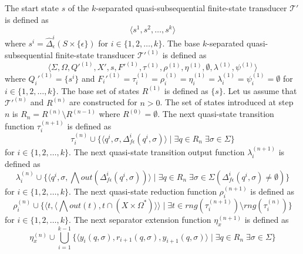 The start state $s$ of the $k$-separated quasi-subsequential finite-state transducer
$\mathcal{T}'$ is defined as
\begin{equation*}
  \langle s^1, s^2, \ldots, s^k \rangle
\end{equation*}
where $s^i = \hat{\Delta}_\epsilon^i(S \times \{ \epsilon \})$ for $i \in \{ 1, 2,
\ldots, k \}$. The base $k$-separated quasi-subsequential finite-state transducer
$\mathcal{T}'^{(1)}$ is defined as
\begin{equation*}
  \langle \Sigma, \Omega, Q'^{(1)}, X', s, F'^{(1)}, \tau^{(1)}, \rho^{(1)},
  \eta^{(1)}, \emptyset, \lambda^{(1)}, \psi^{(1)} \rangle
\end{equation*}
where $Q_i'^{(1)} = \{ s^i \}$ and $F_i'^{(1)} = \tau_i^{(1)} = \rho_i^{(1)} =
\eta_i^{(1)} = \lambda_i^{(1)} = \psi_i^{(1)} = \emptyset$ for $i \in \{ 1, 2,
\ldots, k \}$.
The base set of states $R^{(1)}$ is defined as $\{ s \}$.
Let us assume that $\mathcal{T}'^{(n)}$ and $R^{(n)}$ are constructed for $n > 0$.
The set of states introduced at step $n$ is $R_n = R^{(n)} \setminus R^{(n-1)}$ where
$R^{(0)} = \emptyset$.
The next quasi-state transition function $\tau_i^{(n+1)}$ is defined as
\begin{equation*}
  \tau_i^{(n)} \cup \{ \langle q^i, \sigma, \Delta_{f\epsilon}^i(q^i, \sigma) \rangle
  \mid \exists q \in R_n \; \exists \sigma \in \Sigma \}
\end{equation*}
for $i \in \{ 1, 2, \ldots, k \}$.
The next quasi-state transition output function $\lambda_i^{(n+1)}$ is defined as
\begin{equation*}
  \lambda_i^{(n)} \cup \{ \langle q^i, \sigma, \bigwedge
  out(\Delta_{f\epsilon}^i(q^i, \sigma)) \rangle \mid \exists q \in R_n \; \exists
  \sigma \in \Sigma (\Delta_{f\epsilon}^i(q^i, \sigma) \neq \emptyset) \}
\end{equation*}
for $i \in \{ 1, 2, \ldots, k \}$.
The next quasi-state reduction function $\rho_i^{(n+1)}$ is defined as
\begin{equation*}
  \rho_i^{(n)} \cup \{ \langle t, \langle \bigwedge out(t), t \cap (X \times \Omega^*)
  \rangle \rangle \mid \exists t \in rng(\tau_i^{(n+1)}) \setminus rng(\tau_i^{(n)}) \}
\end{equation*}
for $i \in \{ 1, 2, \ldots, k \}$.
The next separator extension function $\eta_x^{(n+1)}$ is defined as
\begin{equation*}
  \eta_x^{(n)} \cup \bigcup_{i=1}^{k-1} \{ \langle y_i(q, \sigma), r_{i+1}(q,
  \sigma), y_{i+1}(q, \sigma) \rangle \mid \exists q \in R_n \; \exists \sigma \in
  \Sigma \}
\end{equation*}

